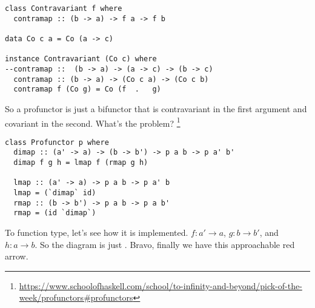 \begin{lstlisting}
class Contravariant f where
  contramap :: (b -> a) -> f a -> f b

data Co c a = Co (a -> c)

instance Contravariant (Co c) where
--contramap ::  (b -> a) -> (a -> c) -> (b -> c)
  contramap :: (b -> a) -> (Co c a) -> (Co c b)
  contramap f (Co g) = Co (f  .   g)
\end{lstlisting}

So a profunctor is just a bifunctor that is contravariant in the first argument
and covariant in the second. What's the problem?
\footnote{\url{https://www.schoolofhaskell.com/school/to-infinity-and-beyond/pick-of-the-week/profunctors\#profunctors}}

\begin{lstlisting}
class Profunctor p where
  dimap :: (a' -> a) -> (b -> b') -> p a b -> p a' b'
  dimap f g h = lmap f (rmap g h)

  lmap :: (a' -> a) -> p a b -> p a' b
  lmap = (`dimap` id)
  rmap :: (b -> b') -> p a b -> p a b'
  rmap = (id `dimap`)
\end{lstlisting}

To function type, let's see how it is implemented. $f : a' \to a$, $g : b \to
b'$, and $h : a \to b$. So the diagram is just . Bravo, finally we have this
approachable red arrow.

